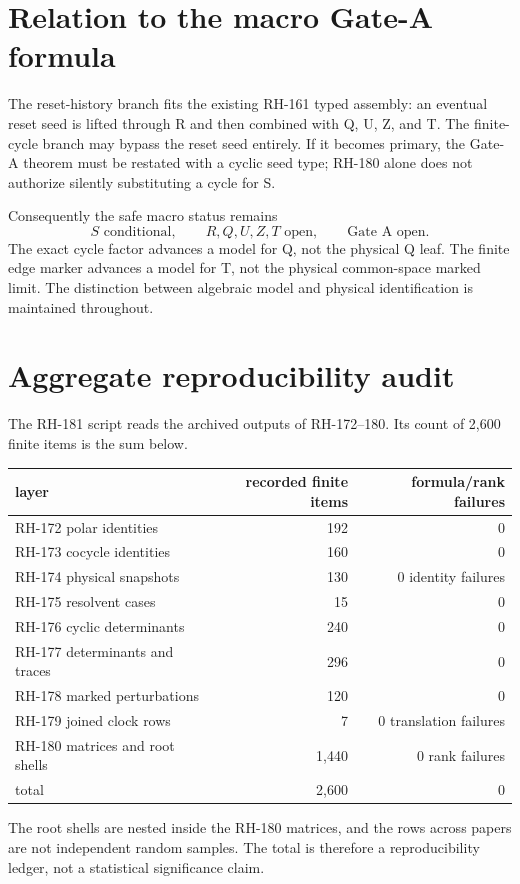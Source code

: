 \documentclass[12pt]{article}
\theoremstyle{remark}
\begin{document}
\section{Relation to the macro Gate-A formula}

The reset-history branch fits the existing RH-161 typed assembly: an eventual
reset seed is lifted through R and then combined with Q, U, Z, and T.  The
finite-cycle branch may bypass the reset seed entirely.  If it becomes
primary, the Gate-A theorem must be restated with a cyclic seed type; RH-180
alone does not authorize silently substituting a cycle for S.

Consequently the safe macro status remains
\begin{equation}\label{eq:macro}
 S\text{ conditional},
 \qquad R,Q,U,Z,T\text{ open},
 \qquad \text{Gate A open}.
\end{equation}
The exact cycle factor advances a model for Q, not the physical Q leaf.  The
finite edge marker advances a model for T, not the physical common-space
marked limit.  The distinction between algebraic model and physical
identification is maintained throughout.

\section{Aggregate reproducibility audit}

The RH-181 script reads the archived outputs of RH-172--180.  Its count of
2,600 finite items is the sum below.
\begin{center}
\begin{tabular}{lrr}
\toprule
layer & recorded finite items & formula/rank failures\\
\midrule
RH-172 polar identities & 192 & 0\\
RH-173 cocycle identities & 160 & 0\\
RH-174 physical snapshots & 130 & 0 identity failures\\
RH-175 resolvent cases & 15 & 0\\
RH-176 cyclic determinants & 240 & 0\\
RH-177 determinants and traces & 296 & 0\\
RH-178 marked perturbations & 120 & 0\\
RH-179 joined clock rows & 7 & 0 translation failures\\
RH-180 matrices and root shells & 1,440 & 0 rank failures\\
\midrule
total & 2,600 & 0\\
\bottomrule
\end{tabular}
\end{center}
The root shells are nested inside the RH-180 matrices, and the rows across
papers are not independent random samples.  The total is therefore a
reproducibility ledger, not a statistical significance claim.
\end{document}
